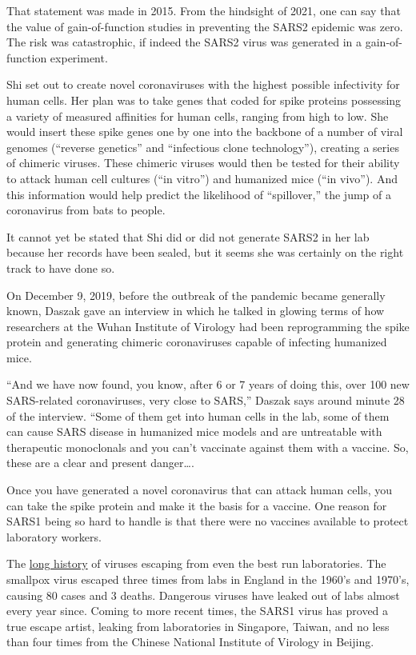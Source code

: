 \documentclass[
]{book}
\begin{document}
That statement was made in 2015. From the hindsight of 2021, one can say that the value of gain-of-function studies in preventing the SARS2 epidemic was zero. The risk was catastrophic, if indeed the SARS2 virus was generated in a gain-of-function experiment.

Shi set out to create novel coronaviruses with the highest possible infectivity for human cells. Her plan was to take genes that coded for spike proteins possessing a variety of measured affinities for human cells, ranging from high to low. She would insert these spike genes one by one into the backbone of a number of viral genomes (``reverse genetics'' and ``infectious clone technology''), creating a series of chimeric viruses. These chimeric viruses would then be tested for their ability to attack human cell cultures (``in vitro'') and humanized mice (``in vivo''). And this information would help predict the likelihood of ``spillover,'' the jump of a coronavirus from bats to people.

It cannot yet be stated that Shi did or did not generate SARS2 in her lab because her records have been sealed, but it seems she was certainly on the right track to have done so.

On December 9, 2019, before the outbreak of the pandemic became generally known, Daszak gave an interview in which he talked in glowing terms of how researchers at the Wuhan Institute of Virology had been reprogramming the spike protein and generating chimeric coronaviruses capable of infecting humanized mice.

``And we have now found, you know, after 6 or 7 years of doing this, over 100 new SARS-related coronaviruses, very close to SARS,'' Daszak says around minute 28 of the interview. ``Some of them get into human cells in the lab, some of them can cause SARS disease in humanized mice models and are untreatable with therapeutic monoclonals and you can't vaccinate against them with a vaccine. So, these are a clear and present danger\ldots.

Once you have generated a novel coronavirus that can attack human cells, you can take the spike protein and make it the basis for a vaccine.
One reason for SARS1 being so hard to handle is that there were no vaccines available to protect laboratory workers.

The \href{https://armscontrolcenter.org/wp-content/uploads/2016/02/Escaped-Viruses-final-2-17-14-copy.pdf}{long history} of viruses escaping from even the best run laboratories. The smallpox virus escaped three times from labs in England in the 1960's and 1970's, causing 80 cases and 3 deaths. Dangerous viruses have leaked out of labs almost every year since. Coming to more recent times, the SARS1 virus has proved a true escape artist, leaking from laboratories in Singapore, Taiwan, and no less than four times from the Chinese National Institute of Virology in Beijing.
\end{document}
